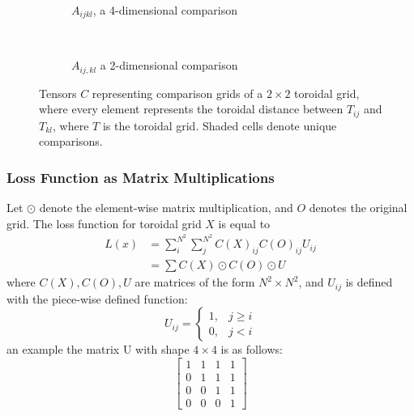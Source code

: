 \begin{figure}[htpb]
    \centering
    \begin{subfigure}[t]{0.5\textwidth}
    \begin{center}
    \end{center}
    \caption{$A_{ijkl}$, a 4-dimensional comparison}
    \label{fig:4dcomparison}
    \end{subfigure}%
    ~
    \begin{subfigure}[t]{0.5\textwidth}
    \begin{center}
    \end{center}
    \caption{$A_{ij,kl}$ a 2-dimensional comparison}
    \label{fig:2dcomparison}
    \end{subfigure}

    \caption{Tensors $C$ representing comparison grids of a $2\times 2$ toroidal grid, where every element represents the toroidal distance between $T_{ij}$ and $T_{kl}$, where $T$ is the toroidal grid. Shaded cells denote unique comparisons.}%
    \label{fig:comparisonGrids}
\end{figure}

\subsubsection{Loss Function as Matrix Multiplications}%
\label{ssub:loss_function_as_matrix_multiplications}
Let $\odot$ denote the element-wise matrix multiplication, and $O$ denotes the original grid. The loss function for toroidal grid $X$ is equal to
\begin{align*}
    L(x)&=\sum_i^{N^2}\sum_j^{N^2}C(X)_{ij}C(O)_{ij}U_{ij}\\
        &=\sum C(X)\odot C(O)\odot U
\end{align*}
where $C(X),C(O),U$ are matrices of the form $N^2\times N^2$, and $U_{ij}$ is defined with the piece-wise defined function:
\begin{equation}
    U_{ij}=
    \begin{cases}
        1, & j\geq i \\
        0, & j<i
    \end{cases}
\end{equation}
an example the matrix U with shape $4\times 4$ is as follows:
 \begin{equation}
    \begin{bmatrix}
        1&1&1&1\\
        0&1&1&1\\
        0&0&1&1\\
        0&0&0&1
    \end{bmatrix}
\end{equation}
